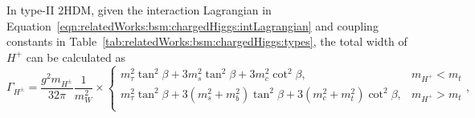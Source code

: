 \begin{table}[ht]
    \centering
    \setlength{\tabcolsep}{1em}
    \renewcommand{\arraystretch}{1.5}
    \caption{ There are four possibilities of 2HDM if imposing flavor conservation. The four types differ from each other by the specific way fermion mass to generate with $\Phi_1,\Phi_2$ .The second and third column show the fermion mass which $\Phi_1,\Phi_2$ is responsible for in the four types. The last three columns show the coupling constants A, B, C in the interaction Lagrangian in Equation~\ref{eqn:relatedWorks:bsm:chargedHiggs:intLagrangian}.}
    \label{tab:relatedWorks:bsm:chargedHiggs:types}
\end{table}



In type-II 2HDM, given the interaction Lagrangian in Equation~\ref{eqn:relatedWorks:bsm:chargedHiggs:intLagrangian} and coupling constants in Table~\ref{tab:relatedWorks:bsm:chargedHiggs:types}, the total width of $H^+$ can be calculated as \cite{PhysRevD.99.095012}
\begin{equation}
    \Gamma_{H^\pm} = \frac{g^2 m_{H^\pm}}{32 \pi} \frac{1}{m^2_W} \times
    \begin{cases}
        m_\tau^2 \tan^2 \beta+ 3 m_s^2 \tan^2 \beta  + 3 m_c^2 \cot^2 \beta , & m_{H^+} < m_t \\
        m_\tau^2 \tan^2 \beta+ 3 (m_s^2+m_b^2) \tan^2 \beta  + 3 (m_c^2+m_t^2) \cot^2 \beta  , & m_{H^+} > m_t \\
    \end{cases}
    ,
\end{equation}

